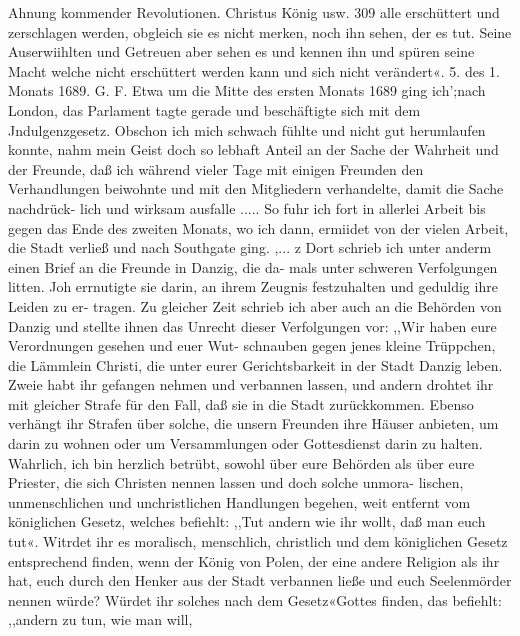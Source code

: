 Ahnung kommender Revolutionen. Christus König usw. 309
alle erschüttert und zerschlagen werden, obgleich sie es nicht
merken, noch ihn sehen, der es tut. Seine Auserwiihlten und
Getreuen aber sehen es und kennen ihn und spüren seine Macht
welche nicht erschüttert werden kann und sich nicht verändert«.
5. des 1. Monats 1689. G. F.
Etwa um die Mitte des ersten Monats 1689 ging ich’;nach
London, das Parlament tagte gerade und beschäftigte sich mit
dem Jndulgenzgesetz. Obschon ich mich schwach fühlte und nicht
gut herumlaufen konnte, nahm mein Geist doch so lebhaft Anteil
an der Sache der Wahrheit und der Freunde, daß ich während
vieler Tage mit einigen Freunden den Verhandlungen beiwohnte
und mit den Mitgliedern verhandelte, damit die Sache nachdrück-
lich und wirksam ausfalle .....
So fuhr ich fort in allerlei Arbeit bis gegen das Ende des
zweiten Monats, wo ich dann, ermiidet von der vielen Arbeit,
die Stadt verließ und nach Southgate ging. ,... z Dort schrieb
ich unter anderm einen Brief an die Freunde in Danzig, die da-
mals unter schweren Verfolgungen litten. Joh errnutigte sie darin,
an ihrem Zeugnis festzuhalten und geduldig ihre Leiden zu er-
tragen. Zu gleicher Zeit schrieb ich aber auch an die Behörden
von Danzig und stellte ihnen das Unrecht dieser Verfolgungen vor:
,,Wir haben eure Verordnungen gesehen und euer Wut-
schnauben gegen jenes kleine Trüppchen, die Lämmlein Christi,
die unter eurer Gerichtsbarkeit in der Stadt Danzig leben. Zweie
habt ihr gefangen nehmen und verbannen lassen, und andern
drohtet ihr mit gleicher Strafe für den Fall, daß sie in die Stadt
zurückkommen. Ebenso verhängt ihr Strafen über solche, die
unsern Freunden ihre Häuser anbieten, um darin zu wohnen oder
um Versammlungen oder Gottesdienst darin zu halten. Wahrlich,
ich bin herzlich betrübt, sowohl über eure Behörden als über eure
Priester, die sich Christen nennen lassen und doch solche unmora-
lischen, unmenschlichen und unchristlichen Handlungen begehen,
weit entfernt vom königlichen Gesetz, welches befiehlt: ,,Tut andern
wie ihr wollt, daß man euch tut«. Witrdet ihr es moralisch,
menschlich, christlich und dem königlichen Gesetz entsprechend finden,
wenn der König von Polen, der eine andere Religion als ihr
hat, euch durch den Henker aus der Stadt verbannen ließe und
euch Seelenmörder nennen würde? Würdet ihr solches nach dem
Gesetz«Gottes finden, das befiehlt: ,,andern zu tun, wie man will,

